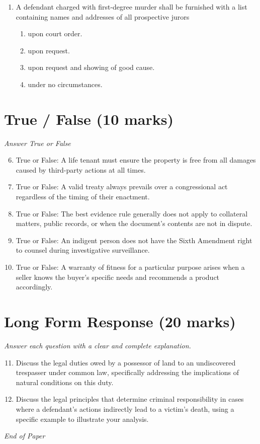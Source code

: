 \documentclass[12pt]{article}
\begin{document}
\begin{enumerate}[label=\arabic*.]
\begin{enumerate}[label=(\alph*)]
    \item Is valid for three months.
    \item Is nonassignable.
    \item Can not exceed a three-month duration even if consideration is given.
\end{enumerate}
\item A defendant charged with first-degree murder shall be furnished with a list containing names and addresses of all prospective jurors
\begin{enumerate}[label=(\alph*)]
    \item upon court order.
    \item upon request.
    \item upon request and showing of good cause.
    \item under no circumstances.
\end{enumerate}
\end{enumerate}

\section*{True / False (10 marks)}
\textit{Answer True or False}
\begin{enumerate}[label=\arabic*.]
\setcounter{enumi}{5}
\item True or False: A life tenant must ensure the property is free from all damages caused by third-party actions at all times.
\item True or False: A valid treaty always prevails over a congressional act regardless of the timing of their enactment.
\item True or False: The best evidence rule generally does not apply to collateral matters, public records, or when the document's contents are not in dispute.
\item True or False: An indigent person does not have the Sixth Amendment right to counsel during investigative surveillance.
\item True or False: A warranty of fitness for a particular purpose arises when a seller knows the buyer's specific needs and recommends a product accordingly.
\end{enumerate}

\section*{Long Form Response (20 marks)}
\textit{Answer each question with a clear and complete explanation.}
\begin{enumerate}[label=\arabic*.]
\setcounter{enumi}{10}
\item Discuss the legal duties owed by a possessor of land to an undiscovered trespasser under common law, specifically addressing the implications of natural conditions on this duty.
\item Discuss the legal principles that determine criminal responsibility in cases where a defendant's actions indirectly lead to a victim's death, using a specific example to illustrate your analysis.
\end{enumerate}

\vfill
\noindent\textit{End of Paper}
\end{document}
